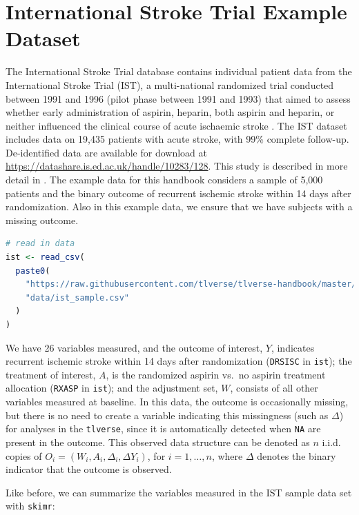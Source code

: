 \documentclass[12pt, krantz2,]{krantz}
\newcommand{\passthrough}[1]{#1}
\theoremstyle{definition}
\theoremstyle{definition}
\theoremstyle{definition}
\newcommand{\1}{\mathbbm{1}}
\begin{document}
\hypertarget{ist}{%
\section{International Stroke Trial Example Dataset}\label{ist}}

The International Stroke Trial database contains individual patient data from
the International Stroke Trial (IST), a multi-national randomized trial
conducted between 1991 and 1996 (pilot phase between 1991 and 1993) that aimed
to assess whether early administration of aspirin, heparin, both aspirin and
heparin, or neither influenced the clinical course of acute ischaemic stroke
\citep{sandercock1997international}. The IST dataset includes data on 19,435 patients
with acute stroke, with 99\% complete follow-up. De-identified data are
available for download at \url{https://datashare.is.ed.ac.uk/handle/10283/128}. This
study is described in more detail in \citet{sandercock2011international}. The example
data for this handbook considers a sample of 5,000 patients and the binary
outcome of recurrent ischemic stroke within 14 days after randomization. Also
in this example data, we ensure that we have subjects with a missing outcome.

\begin{lstlisting}[language=R]
# read in data
ist <- read_csv(
  paste0(
    "https://raw.githubusercontent.com/tlverse/tlverse-handbook/master/",
    "data/ist_sample.csv"
  )
)
\end{lstlisting}

We have 26 variables measured, and the outcome of interest, \(Y\),
indicates recurrent ischemic stroke within 14 days after randomization (\passthrough{\lstinline!DRSISC!}
in \passthrough{\lstinline!ist!}); the treatment of interest, \(A\), is the randomized aspirin vs.~no
aspirin treatment allocation (\passthrough{\lstinline!RXASP!} in \passthrough{\lstinline!ist!}); and the adjustment set, \(W\),
consists of all other variables measured at baseline. In this data, the outcome
is occasionally missing, but there is no need to create a variable indicating
this missingness (such as \(\Delta\)) for analyses in the \passthrough{\lstinline!tlverse!}, since it is
automatically detected when \passthrough{\lstinline!NA!} are present in the outcome. This observed data
structure can be denoted as \(n\) i.i.d. copies of \(O_i = (W_i, A_i, \Delta_i, \Delta Y_i)\), for \(i = 1, \ldots, n\), where \(\Delta\) denotes the binary
indicator that the outcome is observed.

Like before, we can summarize the variables measured in the IST sample data set
with \passthrough{\lstinline!skimr!}:
\end{document}
